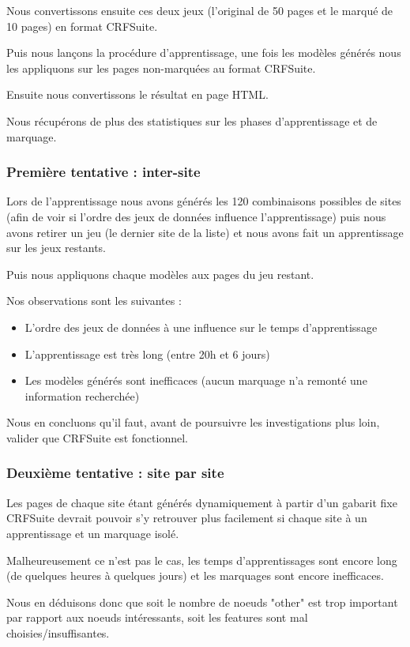 \documentclass{article}
\begin{document}
Nous convertissons ensuite ces deux jeux (l'original de 50 pages et le marqué de 10
pages) en format CRFSuite.

Puis nous lançons la procédure d'apprentissage, une fois les modèles générés
nous les appliquons sur les pages non-marquées au format CRFSuite.

Ensuite nous convertissons le résultat en page HTML.

Nous récupérons de plus des statistiques sur les phases d'apprentissage et de
marquage.

\subsubsection{Première tentative : inter-site}
Lors de l'apprentissage nous avons générés les 120 combinaisons possibles de sites
(afin de voir si l'ordre des jeux de données influence l'apprentissage)
puis nous avons retirer un jeu (le dernier site de la liste) et nous avons fait
un apprentissage sur les jeux restants.

Puis nous appliquons chaque modèles aux pages du jeu restant.

Nos observations sont les suivantes :

\begin{itemize}
 \item L'ordre des jeux de données à une influence sur le temps d'apprentissage
 \item L'apprentissage est très long (entre 20h et 6 jours)
 \item Les modèles générés sont inefficaces (aucun marquage n'a remonté une information recherchée)
\end{itemize}

Nous en concluons qu'il faut, avant de poursuivre les investigations plus loin,
valider que CRFSuite est fonctionnel.

\subsubsection{Deuxième tentative : site par site}
Les pages de chaque site étant générés dynamiquement à partir d'un gabarit fixe
CRFSuite devrait pouvoir s'y retrouver plus facilement si chaque site à un apprentissage
et un marquage isolé.

Malheureusement ce n'est pas le cas, les temps d'apprentissages sont encore long (de
quelques heures à quelques jours) et les marquages sont encore inefficaces.

Nous en déduisons donc que soit le nombre de noeuds "other" est trop important par
rapport aux noeuds intéressants, soit les features sont mal choisies/insuffisantes.
\end{document}
